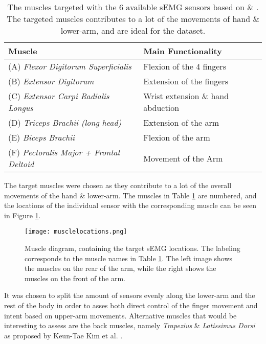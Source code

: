 \documentclass[../main.tex]{subfiles}
\begin{document}
\begin{table}[H]
\begin{center}
\begin{tabular}{ |l|l| } 
\hline
Muscle & Main Functionality \\ 
\hline
(A) \textit{Flexor Digitorum Superficialis} & Flexion of the 4 fingers \\
(B) \textit{Extensor Digitorum} & Extension of the fingers \\
(C) \textit{Extensor Carpi Radialis Longus} & Wrist extension \& hand abduction \\
(D) \textit{Triceps Brachii (long head)} & Extension of the arm \\
(E) \textit{Biceps Brachii} & Flexion of the arm \\
(F) \textit{Pectoralis Major + Frontal Deltoid} & Movement of the Arm \\
\hline
\end{tabular}
\caption{The muscles targeted with the 6 available sEMG sensors based on \cite{Batzianoulis2018} \& \cite{jarque2019}.
 The targeted muscles contributes to a lot of the movements of hand \& lower-arm, and are ideal for the dataset.
}
\label{tab:muscletargets}
\end{center}
\end{table}

The target muscles were chosen as they contribute to a lot of the overall movements of the hand \& lower-arm.
The muscles in Table \ref{tab:muscletargets} are numbered, and the locations of the individual sensor with the corresponding muscle can be seen in Figure \ref{fig:musclesensordiagram}.

\begin{figure}[H]
\begin{center}
\texttt{[image: musclelocations.png]}
\caption{Muscle diagram, containing the target sEMG locations. The labeling corresponds to the muscle names in Table \ref{tab:muscletargets}. The left image shows the muscles on the rear of the arm, while the right shows the muscles on the front of the arm.}
\label{fig:musclesensordiagram}
\end{center}
\end{figure}

It was chosen to split the amount of sensors evenly along the lower-arm and the rest of the body in order to asses both direct control of the finger movement and intent based on upper-arm movements.
Alternative muscles that would be interesting to assess are the back muscles, namely \textit{Trapezius} \& \textit{Latissimus Dorsi} as proposed by Keun-Tae Kim et al. \cite{KeunTaeKim2021}.
\end{document}

